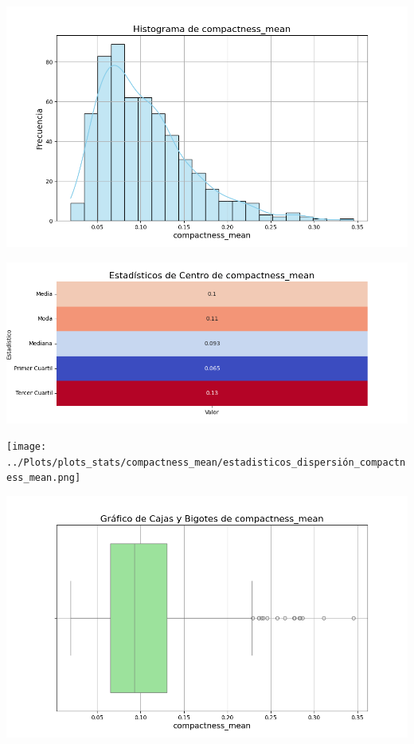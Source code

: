 \documentclass[a4paper, 12pt]{article}
\begin{document}
	\includegraphics[width=\textwidth]{../Plots/plots_stats/compactness_mean/histograma_compactness_mean.png}




\includegraphics[width=\textwidth]{../Plots/plots_stats/compactness_mean/estadisticas_centro_compactness_mean.png}




\texttt{[image: ../Plots/plots\_stats/compactness\_mean/estadisticos\_dispersión\_compactness\_mean.png]}



\includegraphics[width=\textwidth]{../Plots/plots_stats/compactness_mean/boxplot_compactness_mean.png}
\end{document}
